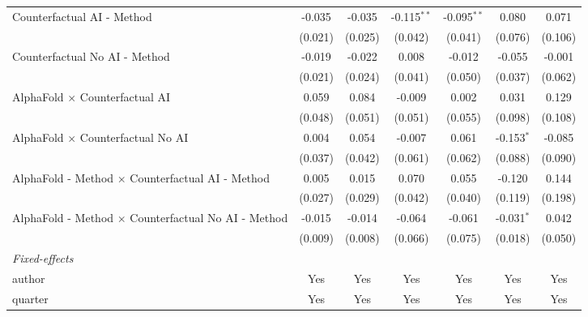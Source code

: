 \begin{tabular}{lcccccc}
   Counterfactual AI - Method                                 & -0.035  & -0.035        & -0.115$^{**}$ & -0.095$^{**}$ & 0.080        & 0.071\\   
                                                              & (0.021) & (0.025)       & (0.042)       & (0.041)       & (0.076)      & (0.106)\\   
   Counterfactual No AI - Method                              & -0.019  & -0.022        & 0.008         & -0.012        & -0.055       & -0.001\\   
                                                              & (0.021) & (0.024)       & (0.041)       & (0.050)       & (0.037)      & (0.062)\\   
   AlphaFold $\times$ Counterfactual AI                       & 0.059   & 0.084         & -0.009        & 0.002         & 0.031        & 0.129\\   
                                                              & (0.048) & (0.051)       & (0.051)       & (0.055)       & (0.098)      & (0.108)\\   
   AlphaFold $\times$ Counterfactual No AI                    & 0.004   & 0.054         & -0.007        & 0.061         & -0.153$^{*}$ & -0.085\\   
                                                              & (0.037) & (0.042)       & (0.061)       & (0.062)       & (0.088)      & (0.090)\\   
   AlphaFold - Method $\times$ Counterfactual AI - Method     & 0.005   & 0.015         & 0.070         & 0.055         & -0.120       & 0.144\\   
                                                              & (0.027) & (0.029)       & (0.042)       & (0.040)       & (0.119)      & (0.198)\\   
   AlphaFold - Method $\times$ Counterfactual No AI - Method  & -0.015  & -0.014        & -0.064        & -0.061        & -0.031$^{*}$ & 0.042\\   
                                                              & (0.009) & (0.008)       & (0.066)       & (0.075)       & (0.018)      & (0.050)\\   
   \midrule
   \emph{Fixed-effects}\\
   author                                                     & Yes     & Yes           & Yes           & Yes           & Yes          & Yes\\  
   quarter                                                    & Yes     & Yes           & Yes           & Yes           & Yes          & Yes\\  

\end{tabular}
